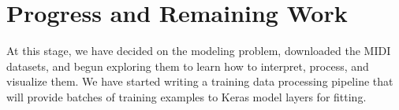 \documentclass[sigconf,authorversion]{acmart}
\begin{document}
\section{Progress and Remaining Work}

At this stage, we have decided on the modeling problem, downloaded the
MIDI datasets, and begun exploring them to learn how to interpret,
process, and visualize them. We have started writing a training data
processing pipeline that will provide batches of training examples to
Keras model layers for fitting.



\end{document}
